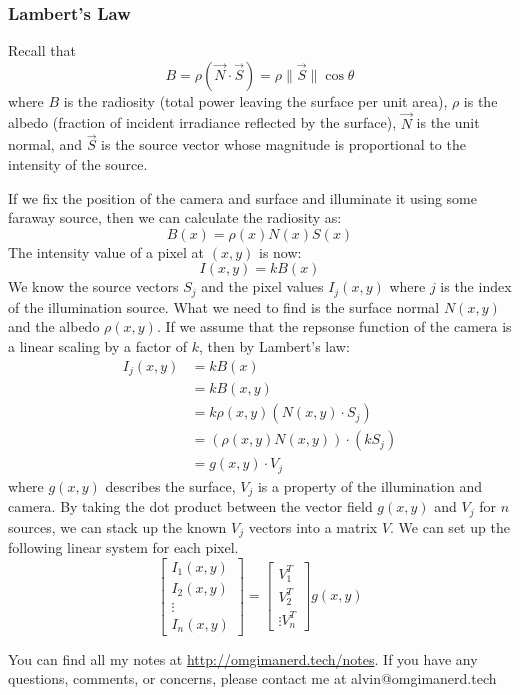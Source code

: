 \documentclass{math}
\begin{document}
\subsubsection*{Lambert's Law}
Recall that
\[ B = \rho(\vec{N}\cdot\vec{S}) = \rho\|\vec{S}\|\cos\theta \]
where \( B \) is the radiosity (total power leaving the surface per unit area),
\( \rho \) is the albedo (fraction of incident irradiance reflected by the
surface), \( \vec{N} \) is the unit normal, and \( \vec{S} \) is the source
vector whose magnitude is proportional to the intensity of the source. \par
If we fix the position of the camera and surface and illuminate it using some
faraway source, then we can calculate the radiosity as:
\[ B(x) = \rho(x)N(x)S(x) \]
The intensity value of a pixel at \( (x,y) \) is now:
\[ I(x,y) = kB(x) \]
We know the source vectors \( S_j \) and the pixel values \( I_j(x,y) \) where
\( j \) is the index of the illumination source. What we need to find is the
surface normal \( N(x,y) \) and the albedo \( \rho(x,y) \). If we assume that
the repsonse function of the camera is a linear scaling by a factor of \( k \),
then by Lambert's law:
\begin{align*}
  I_j(x,y) &= kB(x) \\
  &= kB(x,y) \\
  &= k\rho(x,y)(N(x,y)\cdot S_j) \\
  &= (\rho(x,y)N(x,y))\cdot(kS_j) \\
  &= g(x,y)\cdot V_j
\end{align*}
where \( g(x,y) \) describes the surface, \( V_j \) is a property of the
illumination and camera. By taking the dot product between the vector field
\( g(x,y) \) and \( V_j \) for \( n \) sources, we can stack up the known
\( V_j \) vectors into a matrix \( V \). We can set up the following linear
system for each pixel.
\[ \begin{bmatrix}
  I_1(x,y) \\
  I_2(x,y) \\
  \vdots \\
  I_n(x,y)
\end{bmatrix} = \begin{bmatrix}
  V_1^T \\
  V_2^T \\
  \vdots
  V_n^T
\end{bmatrix}g(x,y) \]

\begin{center}
  You can find all my notes at \url{http://omgimanerd.tech/notes}. If you have
  any questions, comments, or concerns, please contact me at
  alvin@omgimanerd.tech
\end{center}
\end{document}
